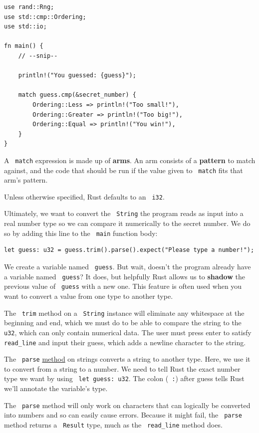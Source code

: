 \documentclass[11pt]{article}
\let\OldTexttt\texttt
\renewcommand{\texttt}[1]{\OldTexttt{\color{MidnightBlue} #1}}
\begin{document}
\begin{verbatim}
use rand::Rng;
use std::cmp::Ordering;
use std::io;

fn main() {
    // --snip--

    println!("You guessed: {guess}");

    match guess.cmp(&secret_number) {
        Ordering::Less => println!("Too small!"),
        Ordering::Greater => println!("Too big!"),
        Ordering::Equal => println!("You win!"),
    }
}
\end{verbatim}

A \texttt{match} expression is made up of \textbf{arms}. An arm consists of a \textbf{pattern} to match against, and the
code that should be run if the value given to \texttt{match} fits that arm’s pattern.

Unless otherwise specified, Rust defaults to an \texttt{i32}.

Ultimately, we want to convert the \texttt{String} the program reads as input into a real number type so
we can compare it numerically to the secret number. We do so by adding this line to the \texttt{main}
function body:
\begin{verbatim}
let guess: u32 = guess.trim().parse().expect("Please type a number!");
\end{verbatim}

We create a variable named \texttt{guess}. But wait, doesn’t the program already have a variable named
\texttt{guess}? It does, but helpfully Rust allows us to \textbf{shadow} the previous value of \texttt{guess} with a new
one. This feature is often used when you want to convert a value from one type to another type.

The \texttt{trim} method on a \texttt{String} instance will eliminate any whitespace at the beginning and end,
which we must do to be able to compare the string to the \texttt{u32}, which can only contain numerical
data. The user must press enter to satisfy \texttt{read\_line} and input their guess, which adds a
newline character to the string.

The \texttt{parse} \href{https://doc.rust-lang.org/std/primitive.str.html\#method.parse}{method} on strings converts a string to another type. Here, we use it to convert from
a string to a number. We need to tell Rust the exact number type we want by using \texttt{let guess: u32}.
The colon (\texttt{:}) after guess tells Rust we’ll annotate the variable’s type.

The \texttt{parse} method will only work on characters that can logically be converted into numbers and
so can easily cause errors. Because it might fail, the \texttt{parse} method returns a \texttt{Result} type, much
as the \texttt{read\_line} method does.
\end{document}
